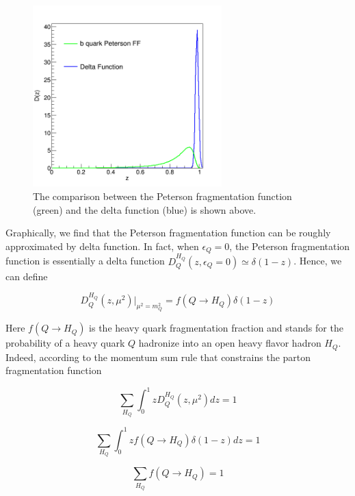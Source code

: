 \begin{figure}[hbtp]
\begin{center}
\includegraphics[width=0.65\textwidth]{Figures/Chapter1/FFPeterson.png}
\caption{The comparison between the Peterson fragmentation function (green) and the delta function (blue) is shown above.}
\label{FONLL}
\end{center}
\end{figure}   


Graphically, we find that the Peterson fragmentation function can be roughly approximated by delta function. In fact, when $\epsilon_Q = $0, the Peterson fragmentation function is essentially a delta function $D^{H_Q}_{Q}(z,\epsilon_Q = 0) \simeq \delta(1 - z)$. Hence, we can define

\begin{equation}
D^{H_Q}_{Q}(z,\mu^2)|_{\mu^2=m_Q^2} = f(Q \rightarrow H_Q) \delta(1 - z)
\end{equation}

Here $f({Q \rightarrow H_Q})$ is the heavy quark fragmentation fraction and stands for the probability of a heavy quark $Q$ hadronize into an open heavy flavor hadron $H_Q$. Indeed, according to the momentum sum rule that constrains the parton fragmentation function \cite{QCDFFunc}

\begin{equation}
\sum_{H_Q} \int_0^1 z D^{H_Q}_{Q}(z,\mu^2) dz = 1
\end{equation}

\begin{equation}
\sum_{H_Q} \int_0^1 z f(Q \rightarrow H_Q) \delta(1 - z) dz = 1
\end{equation}

\begin{equation}
\sum_{H_Q} f(Q \rightarrow H_Q) = 1 
\end{equation}

